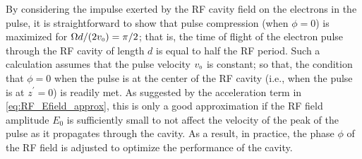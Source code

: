 By considering the impulse exerted by the RF cavity field on the electrons in the pulse, it is straightforward to show that pulse compression (when $\phi = 0$) is maximized for $ \Omega d / (2 v_{{\scriptscriptstyle 0}} ) = \pi /2 $; that is, the time of flight of the electron pulse through the RF cavity of length $ d $ is equal to half the RF period.
Such a calculation assumes that the pulse velocity $v_{{\scriptscriptstyle 0}}$ is constant; so that, the condition that $ \phi = 0 $ when the pulse is at the center of the RF cavity (i.e., when the pulse is at $ z^{\prime} = 0 $) is readily met.
As suggested by the acceleration term in \ref{eq:RF_Efield_approx}, this is only a good approximation if the RF field amplitude $E_{0}$ is sufficiently small to not affect the velocity of the peak of the pulse as it propagates through the cavity.
As a result, in practice, the phase $\phi$ of the RF field is adjusted to optimize the performance of the cavity.

